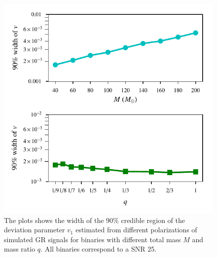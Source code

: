 \documentclass[prd,preprintnumbers,twocolumn,eqsecnum,floatfix,a4paper,nofootinbib,superscriptaddress]{revtex4}
\begin{document}
\begin{figure}[h]
    \begin{center}
    \includegraphics[scale=0.75]{figs/v1_confidence_interval_pol.pdf} 
    \end{center} 
    \caption{The plots shows the width of the 90\% credible region of the deviation parameter $v_1$ estimated from different polarizations of simulated GR signals for binaries with different total mass $M$ and mass ratio $q$. All binaries correspond to a SNR 25.}
    \label{fig:cs_bound}
\end{figure}
\end{document}
